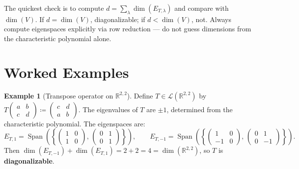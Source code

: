 \documentclass[11pt, a4paper, notitlepage]{report}
\theoremstyle{definition}
\newtheorem{example}[theorem]{Example}
\theoremstyle{remark}
\begin{document}
\begin{examtip}[title={Exam Tip: Checking Diagonalizability}]
The quickest check is to compute $d = \sum_\lambda \dim(E_{T,\lambda})$ and compare with
$\dim(V)$. If $d = \dim(V)$, diagonalizable; if $d < \dim(V)$, not.
Always compute eigenspaces explicitly via row reduction — do not guess dimensions from
the characteristic polynomial alone.
\end{examtip}

\section{Worked Examples}
\label{sec:diag-examples}

\begin{example}[Transpose operator on $\mathbb{R}^{2,2}$]
\label{ex:diag-transpose}
Define $T \in \mathcal{L}(\mathbb{R}^{2,2})$ by
$T\!\begin{pmatrix} a & b \\ c & d \end{pmatrix} \coloneqq \begin{pmatrix} c & d \\ a & b \end{pmatrix}$.
The eigenvalues of $T$ are $\pm 1$, determined from the characteristic polynomial.
The eigenspaces are:
\[
  E_{T,1} = \operatorname{Span}\!\left(\left\{
    \begin{pmatrix}1&0\\1&0\end{pmatrix},\,
    \begin{pmatrix}0&1\\0&1\end{pmatrix}
  \right\}\right), \qquad
  E_{T,-1} = \operatorname{Span}\!\left(\left\{
    \begin{pmatrix}1&0\\{-1}&0\end{pmatrix},\,
    \begin{pmatrix}0&1\\0&{-1}\end{pmatrix}
  \right\}\right).
\]
Then $\dim(E_{T,-1}) + \dim(E_{T,1}) = 2 + 2 = 4 = \dim(\mathbb{R}^{2,2})$, so $T$ is
\textbf{diagonalizable}.
\end{example}
\end{document}
